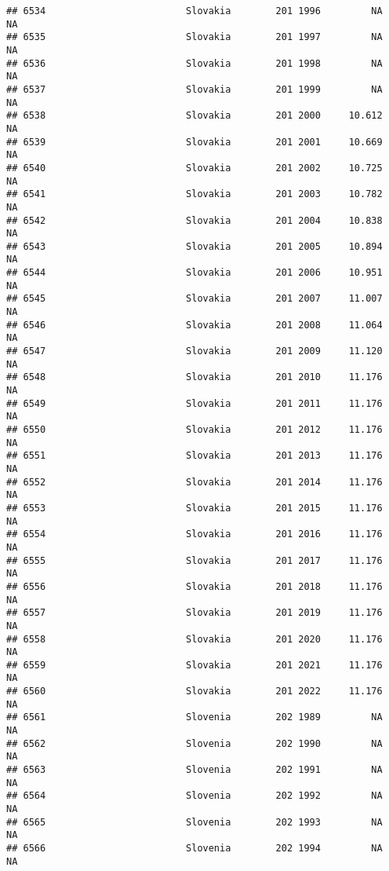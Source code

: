\documentclass[
]{article}
\begin{document}
\begin{verbatim}
## 6534                         Slovakia        201 1996         NA         NA
## 6535                         Slovakia        201 1997         NA         NA
## 6536                         Slovakia        201 1998         NA         NA
## 6537                         Slovakia        201 1999         NA         NA
## 6538                         Slovakia        201 2000     10.612         NA
## 6539                         Slovakia        201 2001     10.669         NA
## 6540                         Slovakia        201 2002     10.725         NA
## 6541                         Slovakia        201 2003     10.782         NA
## 6542                         Slovakia        201 2004     10.838         NA
## 6543                         Slovakia        201 2005     10.894         NA
## 6544                         Slovakia        201 2006     10.951         NA
## 6545                         Slovakia        201 2007     11.007         NA
## 6546                         Slovakia        201 2008     11.064         NA
## 6547                         Slovakia        201 2009     11.120         NA
## 6548                         Slovakia        201 2010     11.176         NA
## 6549                         Slovakia        201 2011     11.176         NA
## 6550                         Slovakia        201 2012     11.176         NA
## 6551                         Slovakia        201 2013     11.176         NA
## 6552                         Slovakia        201 2014     11.176         NA
## 6553                         Slovakia        201 2015     11.176         NA
## 6554                         Slovakia        201 2016     11.176         NA
## 6555                         Slovakia        201 2017     11.176         NA
## 6556                         Slovakia        201 2018     11.176         NA
## 6557                         Slovakia        201 2019     11.176         NA
## 6558                         Slovakia        201 2020     11.176         NA
## 6559                         Slovakia        201 2021     11.176         NA
## 6560                         Slovakia        201 2022     11.176         NA
## 6561                         Slovenia        202 1989         NA         NA
## 6562                         Slovenia        202 1990         NA         NA
## 6563                         Slovenia        202 1991         NA         NA
## 6564                         Slovenia        202 1992         NA         NA
## 6565                         Slovenia        202 1993         NA         NA
## 6566                         Slovenia        202 1994         NA         NA

\end{verbatim}
\end{document}
